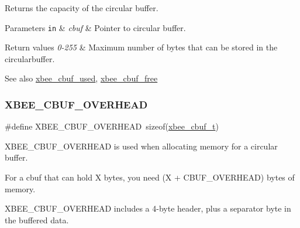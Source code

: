 Returns the capacity of the circular buffer. 


\begin{DoxyParams}[1]{Parameters}
\mbox{\tt in}  & {\em cbuf} & Pointer to circular buffer.\\
\hline
\end{DoxyParams}

\begin{DoxyRetVals}{Return values}
{\em 0-\/255} & Maximum number of bytes that can be stored in the circularbuffer.\\
\hline
\end{DoxyRetVals}
\begin{DoxySeeAlso}{See also}
\hyperlink{group__util__cbuf_gaf3ac1a430fe9dbe3498e96c3b96bb0f7}{xbee\+\_\+cbuf\+\_\+used}, \hyperlink{group__util__cbuf_ga9a2eeedf642bdf31dba98aacdc5a7d75}{xbee\+\_\+cbuf\+\_\+free} 
\end{DoxySeeAlso}
\mbox{\label{group__util__cbuf_ga6fb73f000c9aa3d2b26f3ae089676bfa}} 
\subsubsection{\texorpdfstring{X\+B\+E\+E\+\_\+\+C\+B\+U\+F\+\_\+\+O\+V\+E\+R\+H\+E\+AD}{XBEE\_CBUF\_OVERHEAD}}
{\footnotesize\ttfamily \#define X\+B\+E\+E\+\_\+\+C\+B\+U\+F\+\_\+\+O\+V\+E\+R\+H\+E\+AD~sizeof(\hyperlink{structxbee__cbuf__t}{xbee\+\_\+cbuf\+\_\+t})}



X\+B\+E\+E\+\_\+\+C\+B\+U\+F\+\_\+\+O\+V\+E\+R\+H\+E\+AD is used when allocating memory for a circular buffer. 

For a cbuf that can hold X bytes, you need (X + C\+B\+U\+F\+\_\+\+O\+V\+E\+R\+H\+E\+AD) bytes of memory.

X\+B\+E\+E\+\_\+\+C\+B\+U\+F\+\_\+\+O\+V\+E\+R\+H\+E\+AD includes a 4-\/byte header, plus a separator byte in the buffered data.

